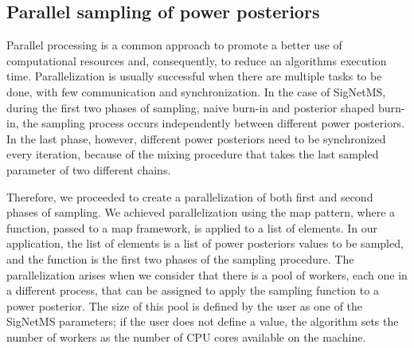 \subsection{Parallel sampling of power posteriors}
Parallel processing is a common approach to promote a better use of
computational resources and, consequently, to reduce an algorithms
execution time. Parallelization is usually successful when there are
multiple tasks to be done, with few communication and synchronization.
In the case of SigNetMS, during the first two phases of sampling, naive
burn-in and posterior shaped burn-in, the sampling process occurs
independently between different power posteriors. In the last phase,
however, different power posteriors need to be synchronized every
iteration, because of the mixing procedure that takes the last sampled
parameter of two different chains. 

%


Therefore, we proceeded to create a parallelization of both first and
second phases of sampling. We achieved parallelization using the map
pattern, where a function, passed to a map framework, is applied to a
list of elements. In our application, the list of elements is a list of
power posteriors values to be sampled, and the function is the first two
phases of the sampling procedure. The parallelization arises when we 
consider that there is a pool of workers, each one in a different 
process, that can be assigned to apply the sampling function to a power 
posterior. The size of this pool is defined by the user as one of the 
SigNetMS parameters; if the user does not define a value, the algorithm 
sets the number of workers as the number of CPU cores available on the 
machine.

